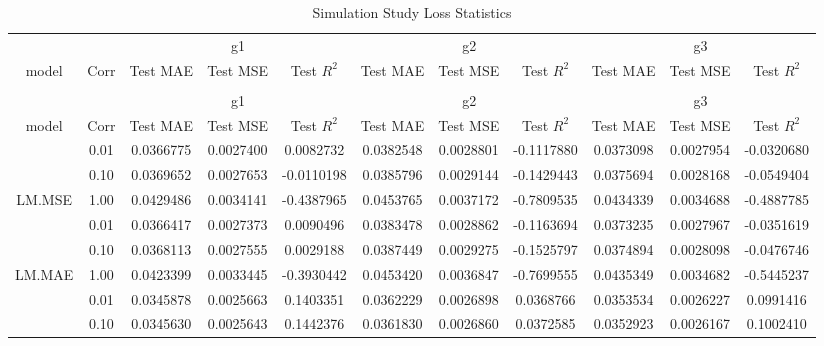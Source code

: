 \begingroup\fontsize{6}{8}\selectfont

\begin{longtable}[t]{ccccccccccc}
\caption{\label{tab:}Simulation Study Loss Statistics}\\
\toprule
\multicolumn{1}{c}{ } & \multicolumn{1}{c}{ } & \multicolumn{3}{c}{g1} & \multicolumn{3}{c}{g2} & \multicolumn{3}{c}{g3} \\
\cmidrule(l{3pt}r{3pt}){3-5} \cmidrule(l{3pt}r{3pt}){6-8} \cmidrule(l{3pt}r{3pt}){9-11}
model & Corr & Test MAE & Test MSE & Test $R^2$ & Test MAE & Test MSE & Test $R^2$ & Test MAE & Test MSE & Test $R^2$\\
\midrule
\endfirsthead
\caption[]{Simulation Study Loss Statistics }\\
\toprule
\multicolumn{1}{c}{ } & \multicolumn{1}{c}{ } & \multicolumn{3}{c}{g1} & \multicolumn{3}{c}{g2} & \multicolumn{3}{c}{g3} \\
\cmidrule(l{3pt}r{3pt}){3-5} \cmidrule(l{3pt}r{3pt}){6-8} \cmidrule(l{3pt}r{3pt}){9-11}
model & Corr & Test MAE & Test MSE & Test $R^2$ & Test MAE & Test MSE & Test $R^2$ & Test MAE & Test MSE & Test $R^2$\\
\midrule
\endhead
\
\endfoot
\bottomrule
\endlastfoot
 & 0.01 & 0.0366775 & 0.0027400 & 0.0082732 & 0.0382548 & 0.0028801 & -0.1117880 & 0.0373098 & 0.0027954 & -0.0320680\\
\cmidrule{2-11}
 & 0.10 & 0.0369652 & 0.0027653 & -0.0110198 & 0.0385796 & 0.0029144 & -0.1429443 & 0.0375694 & 0.0028168 & -0.0549404\\
\cmidrule{2-11}
\multirow{-3}{*}{\centering\arraybackslash LM.MSE} & 1.00 & 0.0429486 & 0.0034141 & -0.4387965 & 0.0453765 & 0.0037172 & -0.7809535 & 0.0434339 & 0.0034688 & -0.4887785\\
\cmidrule{1-11}
 & 0.01 & 0.0366417 & 0.0027373 & 0.0090496 & 0.0383478 & 0.0028862 & -0.1163694 & 0.0373235 & 0.0027967 & -0.0351619\\
\cmidrule{2-11}
 & 0.10 & 0.0368113 & 0.0027555 & 0.0029188 & 0.0387449 & 0.0029275 & -0.1525797 & 0.0374894 & 0.0028098 & -0.0476746\\
\cmidrule{2-11}
\multirow{-3}{*}{\centering\arraybackslash LM.MAE} & 1.00 & 0.0423399 & 0.0033445 & -0.3930442 & 0.0453420 & 0.0036847 & -0.7699555 & 0.0435349 & 0.0034682 & -0.5445237\\
\cmidrule{1-11}
 & 0.01 & 0.0345878 & 0.0025663 & 0.1403351 & 0.0362229 & 0.0026898 & 0.0368766 & 0.0353534 & 0.0026227 & 0.0991416\\
\cmidrule{2-11}
 & 0.10 & 0.0345630 & 0.0025643 & 0.1442376 & 0.0361830 & 0.0026860 & 0.0372585 & 0.0352923 & 0.0026167 & 0.1002410\\

\end{longtable}
